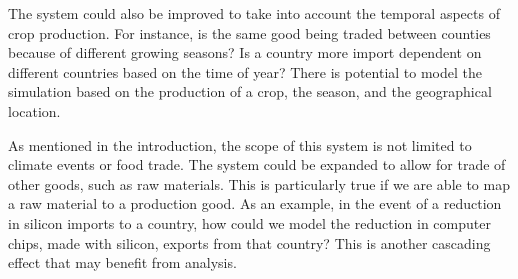 The system could also be improved to take into account the temporal aspects of crop production. For instance, is the same good being traded between counties because of different growing seasons? Is a country more import dependent on different countries based on the time of year? There is potential to model the simulation based on the production of a crop, the season, and the geographical location.\par
As mentioned in the introduction, the scope of this system is not limited to climate events or food trade. The system could be expanded to allow for trade of other goods, such as raw materials. This is particularly true if we are able to map a raw material to a production good. As an example, in the event of a reduction in silicon imports to a country, how could we model the reduction in computer chips, made with silicon, exports from that country? This is another cascading effect that may benefit from analysis.\par